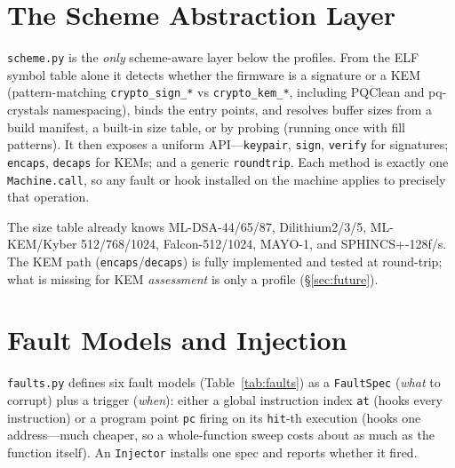 \documentclass[11pt]{article}
\newcommand{\code}[1]{\texttt{#1}}
\begin{document}
\section{The Scheme Abstraction Layer}

\code{scheme.py} is the \emph{only} scheme-aware layer below the profiles. From the
ELF symbol table alone it detects whether the firmware is a signature or a KEM
(pattern-matching \code{crypto\_sign\_*} vs \code{crypto\_kem\_*}, including
PQClean and pq-crystals namespacing), binds the entry points, and resolves buffer
sizes from a build manifest, a built-in size table, or by probing (running once
with fill patterns). It then exposes a uniform API---\code{keypair}, \code{sign},
\code{verify} for signatures; \code{encaps}, \code{decaps} for KEMs; and a generic
\code{roundtrip}. Each method is exactly one \code{Machine.call}, so any fault or
hook installed on the machine applies to precisely that operation.

The size table already knows ML-DSA-44/65/87, Dilithium2/3/5, ML-KEM/Kyber
512/768/1024, Falcon-512/1024, MAYO-1, and SPHINCS+-128f/s. The KEM path
(\code{encaps}/\code{decaps}) is fully implemented and tested at round-trip; what
is missing for KEM \emph{assessment} is only a profile (\S\ref{sec:future}).

\section{Fault Models and Injection}\label{sec:faults}

\code{faults.py} defines six fault models (Table~\ref{tab:faults}) as a
\code{FaultSpec} (\emph{what} to corrupt) plus a trigger (\emph{when}): either a
global instruction index \code{at} (hooks every instruction) or a program point
\code{pc} firing on its \code{hit}-th execution (hooks one address---much cheaper,
so a whole-function sweep costs about as much as the function itself). An
\code{Injector} installs one spec and reports whether it fired.
\end{document}
